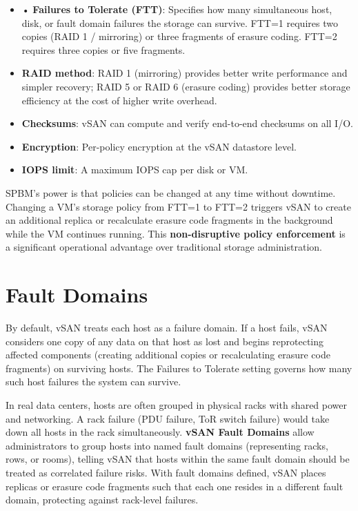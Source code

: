 \begin{itemize}
  \item • \textbf{Failures to Tolerate (FTT)}: Specifies how many simultaneous host, disk, or fault domain failures the storage can survive. FTT=1 requires two copies (RAID 1 / mirroring) or three fragments of erasure coding. FTT=2 requires three copies or five fragments.
  \item \textbf{RAID method}: RAID 1 (mirroring) provides better write performance and simpler recovery; RAID 5 or RAID 6 (erasure coding) provides better storage efficiency at the cost of higher write overhead.
  \item \textbf{Checksums}: vSAN can compute and verify end-to-end checksums on all I/O.
  \item \textbf{Encryption}: Per-policy encryption at the vSAN datastore level.
  \item \textbf{IOPS limit}: A maximum IOPS cap per disk or VM.
\end{itemize}

SPBM's power is that policies can be changed at any time without downtime. Changing a VM's storage policy from FTT=1 to FTT=2 triggers vSAN to create an additional replica or recalculate erasure code fragments in the background while the VM continues running. This \textbf{non-disruptive policy enforcement} is a significant operational advantage over traditional storage administration.

\section{Fault Domains}
By default, vSAN treats each host as a failure domain. If a host fails, vSAN considers one copy of any data on that host as lost and begins reprotecting affected components (creating additional copies or recalculating erasure code fragments) on surviving hosts. The Failures to Tolerate setting governs how many such host failures the system can survive.

In real data centers, hosts are often grouped in physical racks with shared power and networking. A rack failure (PDU failure, ToR switch failure) would take down all hosts in the rack simultaneously. \textbf{vSAN Fault Domains} allow administrators to group hosts into named fault domains (representing racks, rows, or rooms), telling vSAN that hosts within the same fault domain should be treated as correlated failure risks. With fault domains defined, vSAN places replicas or erasure code fragments such that each one resides in a different fault domain, protecting against rack-level failures.

